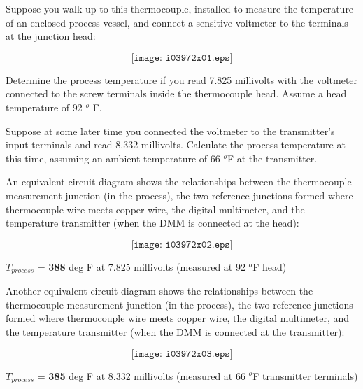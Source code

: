

Suppose you walk up to this thermocouple, installed to measure the temperature of an enclosed process vessel, and connect a sensitive voltmeter to the terminals at the junction head:

$$\texttt{[image: i03972x01.eps]}$$

Determine the process temperature if you read 7.825 millivolts with the voltmeter connected to the screw terminals inside the thermocouple head.  Assume a head temperature of 92 $^{o}$ F.

\vskip 10pt

Suppose at some later time you connected the voltmeter to the transmitter's input terminals and read 8.332 millivolts.  Calculate the process temperature at this time, assuming an ambient temperature of 66 $^{o}$F at the transmitter.  









An equivalent circuit diagram shows the relationships between the thermocouple measurement junction (in the process), the two reference junctions formed where thermocouple wire meets copper wire, the digital multimeter, and the temperature transmitter (when the DMM is connected at the head):

$$\texttt{[image: i03972x02.eps]}$$

$T_{process}$ = {\bf 388} deg F at 7.825 millivolts (measured at 92 $^{o}$F head)

\vskip 30pt

Another equivalent circuit diagram shows the relationships between the thermocouple measurement junction (in the process), the two reference junctions formed where thermocouple wire meets copper wire, the digital multimeter, and the temperature transmitter (when the DMM is connected at the transmitter):

$$\texttt{[image: i03972x03.eps]}$$

$T_{process}$ = {\bf 385} deg F at 8.332 millivolts (measured at 66 $^{o}$F transmitter terminals)











